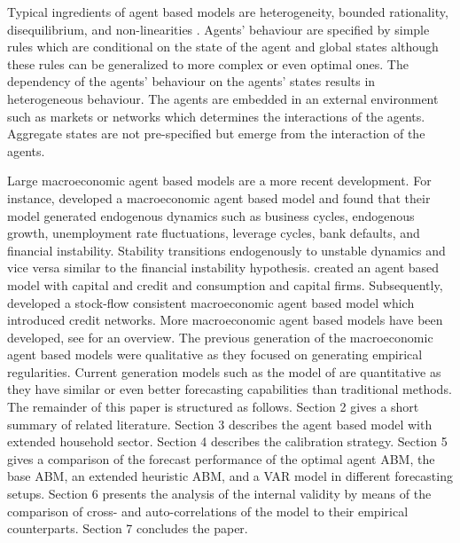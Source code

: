 \noindent Typical ingredients of agent based models are heterogeneity, bounded rationality, disequilibrium, and non-linearities \citep{axtell_agent-based_nodate}. Agents' behaviour are specified by simple rules which are conditional on the state of the agent and global states although these rules can be generalized to more complex or even optimal ones. The dependency of the agents' behaviour on the agents' states results in heterogeneous behaviour. The agents are embedded in an external environment such as markets or networks which determines the interactions of the agents. Aggregate states are not pre-specified but emerge from the interaction of the agents. 

Large macroeconomic agent based models are a more recent development. For instance,\cite{riccetti_agent_2015} developed a macroeconomic agent based model and found that their model generated endogenous dynamics such as business cycles, endogenous growth, unemployment rate fluctuations, leverage cycles, bank defaults, and financial instability. Stability transitions endogenously to unstable dynamics and vice versa similar to the \cite{minsky_financial_1999} financial instability hypothesis. \cite{assenza_emergent_2015} created an agent based model with capital and credit and consumption and capital firms. Subsequently, \cite{caiani_agent_2016} developed a stock-flow consistent macroeconomic agent based model which introduced credit networks. More macroeconomic agent based models have been developed, see \cite{dawid_agent-based_2018} for an overview. The previous generation of the macroeconomic agent based models were qualitative as they focused on generating empirical regularities. Current generation models such as the model of \cite{poledna_economic_2019} are quantitative as they have similar or even better forecasting capabilities than traditional methods.\\

\noindent The remainder of this paper is structured as follows. Section 2 gives a short summary of related literature. Section 3 describes the agent based model with extended household sector. Section 4 describes the calibration strategy. Section 5 gives a comparison of the forecast performance of the optimal agent ABM, the base ABM, an extended heuristic ABM, and a VAR model in different forecasting setups. Section 6 presents the analysis of the internal validity by means of the comparison of cross- and auto-correlations of the model to their empirical counterparts. Section 7 concludes the paper.